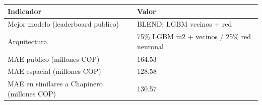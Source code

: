 
\begin{tabular}{ll}
\toprule
Indicador & Valor\\
\midrule
Mejor modelo (leaderboard publico) & BLEND: LGBM vecinos + red\\
Arquitectura & 75\% LGBM m2 + vecinos / 25\% red neuronal\\
MAE publico (millones COP) & 164.53\\
MAE espacial (millones COP) & 128.58\\
MAE en similares a Chapinero (millones COP) & 130.57\\
\bottomrule
\end{tabular}
